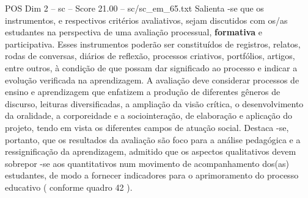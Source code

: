 \begin{textsample}{POS Dim 2 – sc – Score 21.00 – sc/sc\_em\_65.txt}
Salienta -se que os instrumentos, e respectivos critérios avaliativos, sejam discutidos com os/as estudantes na perspectiva de uma avaliação processual, \textbf{formativa} e participativa.
Esses instrumentos poderão ser constituídos de registros, relatos, rodas de conversas, diários de reflexão, processos criativos, portfólios, artigos, entre outros, à condição de que possam dar significado ao processo e indicar a evolução verificada na aprendizagem.
A avaliação deve considerar processos de ensino e aprendizagem que enfatizem a produção de diferentes gêneros de discurso, leituras diversificadas, a ampliação da visão crítica, o desenvolvimento da oralidade, a corporeidade e a sociointeração, de elaboração e aplicação do projeto, tendo em vista os diferentes campos de atuação social.
Destaca -se, portanto, que os resultados da avaliação são foco para a análise pedagógica e a ressignificação da aprendizagem, admitido que os aspectos qualitativos devem sobrepor -se aos quantitativos num movimento de acompanhamento dos(as) estudantes, de modo a fornecer indicadores para o aprimoramento do processo educativo ( conforme quadro 42 ).

\end{textsample}
